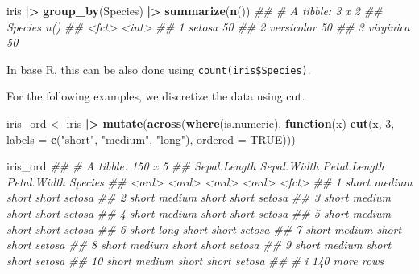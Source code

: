 \documentclass[
  notitlepage]{book}
\newenvironment{Shaded}{\begin{snugshade}}{\end{snugshade}}
\newcommand{\CommentTok}[1]{\textcolor[rgb]{0.56,0.35,0.01}{\textit{#1}}}
\newcommand{\ControlFlowTok}[1]{\textcolor[rgb]{0.13,0.29,0.53}{\textbf{#1}}}
\newcommand{\DataTypeTok}[1]{\textcolor[rgb]{0.13,0.29,0.53}{#1}}
\newcommand{\DecValTok}[1]{\textcolor[rgb]{0.00,0.00,0.81}{#1}}
\newcommand{\ErrorTok}[1]{\textcolor[rgb]{0.64,0.00,0.00}{\textbf{#1}}}
\newcommand{\KeywordTok}[1]{\textcolor[rgb]{0.13,0.29,0.53}{\textbf{#1}}}
\newcommand{\NormalTok}[1]{#1}
\newcommand{\OperatorTok}[1]{\textcolor[rgb]{0.81,0.36,0.00}{\textbf{#1}}}
\newcommand{\OtherTok}[1]{\textcolor[rgb]{0.56,0.35,0.01}{#1}}
\newcommand{\StringTok}[1]{\textcolor[rgb]{0.31,0.60,0.02}{#1}}
\begin{document}
\begin{Shaded}
\begin{Highlighting}[]
\NormalTok{iris }\OperatorTok{|}\ErrorTok{\textgreater{}}\StringTok{ }
\StringTok{  }\KeywordTok{group\_by}\NormalTok{(Species) }\OperatorTok{|}\ErrorTok{\textgreater{}}\StringTok{ }
\StringTok{  }\KeywordTok{summarize}\NormalTok{(}\KeywordTok{n}\NormalTok{())}
\CommentTok{\#\# \# A tibble: 3 x 2}
\CommentTok{\#\#   Species    \textasciigrave{}n()\textasciigrave{}}
\CommentTok{\#\#   \textless{}fct\textgreater{}      \textless{}int\textgreater{}}
\CommentTok{\#\# 1 setosa        50}
\CommentTok{\#\# 2 versicolor    50}
\CommentTok{\#\# 3 virginica     50}
\end{Highlighting}
\end{Shaded}

In base R, this can be also done using \texttt{count(iris\$Species)}.

For the following examples, we discretize the data using cut.

\begin{Shaded}
\begin{Highlighting}[]
\NormalTok{iris\_ord \textless{}{-}}\StringTok{ }\NormalTok{iris }\OperatorTok{|}\ErrorTok{\textgreater{}}\StringTok{ }
\StringTok{  }\KeywordTok{mutate}\NormalTok{(}\KeywordTok{across}\NormalTok{(}\KeywordTok{where}\NormalTok{(is.numeric),  }
    \ControlFlowTok{function}\NormalTok{(x) }\KeywordTok{cut}\NormalTok{(x, }\DecValTok{3}\NormalTok{, }\DataTypeTok{labels =} \KeywordTok{c}\NormalTok{(}\StringTok{"short"}\NormalTok{, }\StringTok{"medium"}\NormalTok{, }\StringTok{"long"}\NormalTok{), }
                    \DataTypeTok{ordered =} \OtherTok{TRUE}\NormalTok{)))}

\NormalTok{iris\_ord}
\CommentTok{\#\# \# A tibble: 150 x 5}
\CommentTok{\#\#    Sepal.Length Sepal.Width Petal.Length Petal.Width Species}
\CommentTok{\#\#    \textless{}ord\textgreater{}        \textless{}ord\textgreater{}       \textless{}ord\textgreater{}        \textless{}ord\textgreater{}       \textless{}fct\textgreater{}  }
\CommentTok{\#\#  1 short        medium      short        short       setosa }
\CommentTok{\#\#  2 short        medium      short        short       setosa }
\CommentTok{\#\#  3 short        medium      short        short       setosa }
\CommentTok{\#\#  4 short        medium      short        short       setosa }
\CommentTok{\#\#  5 short        medium      short        short       setosa }
\CommentTok{\#\#  6 short        long        short        short       setosa }
\CommentTok{\#\#  7 short        medium      short        short       setosa }
\CommentTok{\#\#  8 short        medium      short        short       setosa }
\CommentTok{\#\#  9 short        medium      short        short       setosa }
\CommentTok{\#\# 10 short        medium      short        short       setosa }
\CommentTok{\#\# \# i 140 more rows}
\end{Highlighting}
\end{Shaded}
\end{document}
